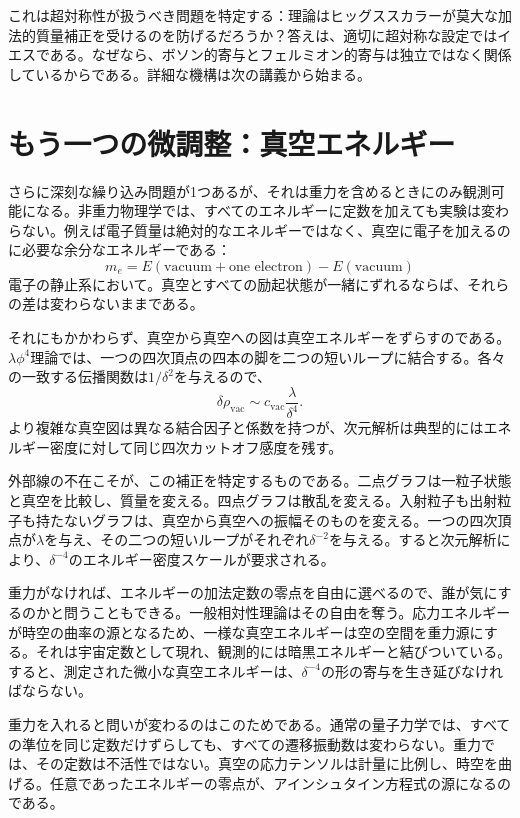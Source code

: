 これは超対称性が扱うべき問題を特定する：理論はヒッグススカラーが莫大な加法的質量補正を受けるのを防げるだろうか？答えは、適切に超対称な設定ではイエスである。なぜなら、ボソン的寄与とフェルミオン的寄与は独立ではなく関係しているからである。詳細な機構は次の講義から始まる。

\section{もう一つの微調整：真空エネルギー}

さらに深刻な繰り込み問題が1つあるが、それは重力を含めるときにのみ観測可能になる。非重力物理学では、すべてのエネルギーに定数を加えても実験は変わらない。例えば電子質量は絶対的なエネルギーではなく、真空に電子を加えるのに必要な余分なエネルギーである：
\begin{equation}
m_e=E(\text{vacuum}+\text{one electron})-E(\text{vacuum})
\end{equation}
電子の静止系において。真空とすべての励起状態が一緒にずれるならば、それらの差は変わらないままである。

それにもかかわらず、真空から真空への図は真空エネルギーをずらすのである。\(\lambda\phi^4\)理論では、一つの四次頂点の四本の脚を二つの短いループに結合する。各々の一致する伝播関数は\(1/\delta^2\)を与えるので、
\begin{equation}
\delta\rho_{\mathrm{vac}}
\sim
c_{\mathrm{vac}}\frac{\lambda}{\delta^4}.
\label{eq:vacuum-energy-divergence}
\end{equation}
より複雑な真空図は異なる結合因子と係数を持つが、次元解析は典型的にはエネルギー密度に対して同じ四次カットオフ感度を残す。

外部線の不在こそが、この補正を特定するものである。二点グラフは一粒子状態と真空を比較し、質量を変える。四点グラフは散乱を変える。入射粒子も出射粒子も持たないグラフは、真空から真空への振幅そのものを変える。一つの四次頂点が\(\lambda\)を与え、その二つの短いループがそれぞれ\(\delta^{-2}\)を与える。すると次元解析により、\(\delta^{-4}\)のエネルギー密度スケールが要求される。

重力がなければ、エネルギーの加法定数の零点を自由に選べるので、誰が気にするのかと問うこともできる。一般相対性理論はその自由を奪う。応力エネルギーが時空の曲率の源となるため、一様な真空エネルギーは空の空間を重力源にする。それは宇宙定数として現れ、観測的には暗黒エネルギーと結びついている。すると、測定された微小な真空エネルギーは、\(\delta^{-4}\)の形の寄与を生き延びなければならない。

重力を入れると問いが変わるのはこのためである。通常の量子力学では、すべての準位を同じ定数だけずらしても、すべての遷移振動数は変わらない。重力では、その定数は不活性ではない。真空の応力テンソルは計量に比例し、時空を曲げる。任意であったエネルギーの零点が、アインシュタイン方程式の源になるのである。

